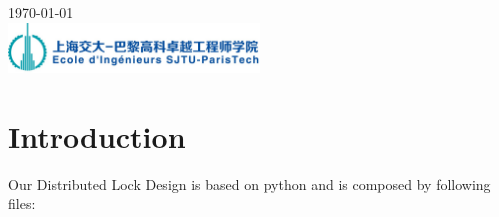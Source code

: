 \documentclass[10pt]{article}
\begin{document}
\begin{titlepage}


{\large \today}\\[2cm] %


\includegraphics[width=0.5\textwidth]{logo_SPEIT.jpg}\\[1cm] %


\vfill %

\end{titlepage}
\indent

\section{Introduction}

Our Distributed Lock Design is based on python and is composed by following files:
\end{document}
